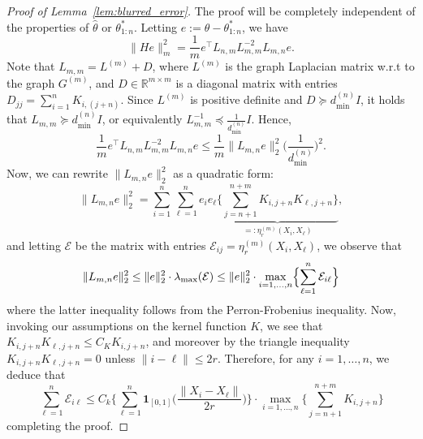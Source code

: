 \documentclass{article}
\newcommand{\Reals}{\mathbb{R}}
\newcommand{\1}{\mathbf{1}}
\newcommand{\mc}[1]{\mathcal{#1}}
\newcommand{\wh}[1]{\widehat{#1}}
\theoremstyle{definition}
\theoremstyle{remark}
\begin{document}
\begin{proof}[Proof of Lemma~\ref{lem:blurred_error}]
	The proof will be completely independent of the properties of $\wh{\theta}$ or $\theta_{1:n}^{\ast}$. Letting $e := \wh{\theta} - \theta_{1:n}^{\ast}$, we have
	\begin{equation*}
	\|He\|_m^2 = \frac{1}{m} e^{\top} L_{n,m} L_{m,m}^{-2} L_{m,n} e.
	\end{equation*}
	Note that $L_{m,m} = L^{(m)} + D$, where $L^{(m)}$ is the graph Laplacian matrix w.r.t to the graph $G^{(m)}$, and $D \in \Reals^{m \times m}$ is a diagonal matrix with entries $D_{jj} = \sum_{i = 1}^{n}K_{i,(j + n)}$. Since $L^{(m)}$ is positive definite and $D \succeq d_{\min}^{(n)} I$, it holds that $L_{m,m} \succcurlyeq d_{\min}^{(n)} I$, or equivalently $L_{m,m}^{-1} \preccurlyeq \frac{1}{d_{\min}^{(n)}} I$. Hence,
	\begin{equation*}
	\frac{1}{m} e^{\top} L_{n,m} L_{m,m}^{-2} L_{m,n} e \leq \frac{1}{m}\|L_{m,n}e\|_{2}^2 \biggl(\frac{1}{d_{\min}^{(n)}}\biggr)^2.
	\end{equation*}
	Now, we can rewrite $\|L_{m,n}e\|_{2}^2$ as a quadratic form:
	\begin{equation*}
	\|L_{m,n}e\|_{2}^2 = \sum_{i = 1}^{n} \sum_{\ell = 1}^{n} e_i e_{\ell} \underbrace{\biggl\{\sum_{j = n + 1}^{n + m} K_{i,j + n} K_{\ell,j + n}\biggr\}}_{=: \eta_r^{(m)}(X_i,X_{\ell})},
	\end{equation*}
	and letting $\mc{E}$ be the matrix with entries $\mc{E}_{ij} = \eta_r^{(m)}(X_i,X_{\ell})$, we observe that
	\begin{equation*}
	\|L_{m,n}e\|_{2}^2 \leq \|e\|_2^2 \cdot \lambda_{\max}(\mc{E}) \leq \|e\|_2^2 \cdot \max_{i = 1,\ldots,n} \Bigl\{\sum_{\ell = 1}^{n} \mc{E}_{i\ell}\Bigr\}
	\end{equation*}
	where the latter inequality follows from the Perron-Frobenius inequality. Now, invoking our assumptions on the kernel function $K$, we see that $K_{i,j + n} K_{\ell,j + n} \leq C_K K_{i,j + n}$, and moreover by the triangle inequality $K_{i,j + n} K_{\ell,j + n} = 0$ unless $\|i - \ell\| \leq 2r$. Therefore, for any $i = 1,\ldots,n$, we deduce that
	\begin{equation*}
	\sum_{\ell = 1}^{n} \mc{E}_{i\ell} \leq C_k \biggl\{\sum_{\ell = 1}^{n} \1_{[0,1]}\biggl(\frac{\|X_i - X_\ell\|}{2r}\biggr) \biggr\} \cdot \max_{i = 1,\ldots,n} \biggl\{\sum_{j = n + 1}^{n + m} K_{i,j + n}\biggr\}
	\end{equation*}
	completing the proof.
\end{proof}
\end{document}
